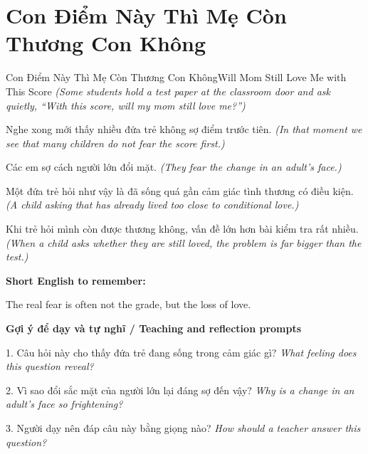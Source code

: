 \section{Con Điểm Này Thì Mẹ Còn Thương Con Không}
\begin{truyen}{Con Điểm Này Thì Mẹ Còn Thương Con Không}{Will Mom Still Love Me with This Score}
\textit{(Some students hold a test paper at the classroom door and ask quietly, “With this score, will my mom still love me?”)}

Nghe xong mới thấy nhiều đứa trẻ không sợ điểm trước tiên.
\textit{(In that moment we see that many children do not fear the score first.)}

Các em sợ cách người lớn đổi mặt.
\textit{(They fear the change in an adult's face.)}

Một đứa trẻ hỏi như vậy là đã sống quá gần cảm giác tình thương có điều kiện.
\textit{(A child asking that has already lived too close to conditional love.)}

\end{truyen}

\begin{baihoc}
Khi trẻ hỏi mình còn được thương không, vấn đề lớn hơn bài kiểm tra rất nhiều.
\textit{(When a child asks whether they are still loved, the problem is far bigger than the test.)}
\end{baihoc}

\begin{ghinhoanh}
\textbf{Short English to remember:}

The real fear is often not the grade, but the loss of love.

\end{ghinhoanh}

\begin{tuhocnhanh}
\textbf{Gợi ý để dạy và tự nghĩ / Teaching and reflection prompts}

1. Câu hỏi này cho thấy đứa trẻ đang sống trong cảm giác gì? \textit{What feeling does this question reveal?}

2. Vì sao đổi sắc mặt của người lớn lại đáng sợ đến vậy? \textit{Why is a change in an adult's face so frightening?}

3. Người dạy nên đáp câu này bằng giọng nào? \textit{How should a teacher answer this question?}
\end{tuhocnhanh}
\ngancach

